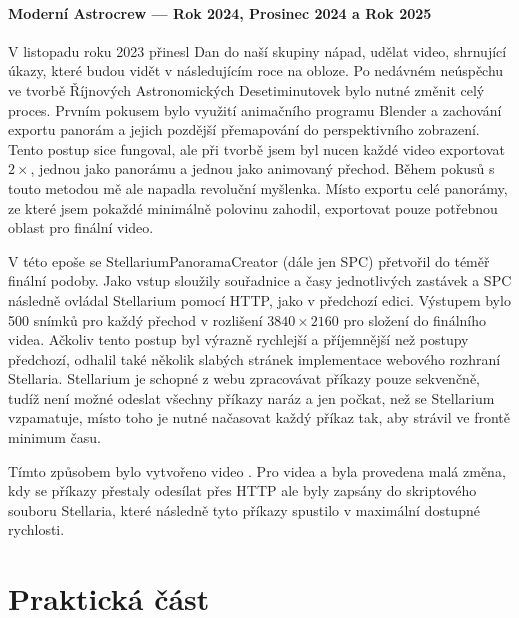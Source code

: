 \documentclass[12pt,a4paper,titlepage]{article}
\begin{document}
\subsection{Moderní Astrocrew --- Rok 2024, Prosinec 2024 a Rok 2025}
V listopadu roku 2023 přinesl Dan do naší skupiny nápad, udělat video, shrnující úkazy, které budou vidět v následujícím roce na obloze. Po nedávném neúspěchu ve tvorbě Říjnových Astronomických Desetiminutovek bylo nutné změnit celý proces. Prvním pokusem bylo využití animačního programu Blender a zachování exportu panorám a jejich pozdější přemapování do perspektivního zobrazení. Tento postup sice fungoval, ale při tvorbě jsem byl nucen každé video exportovat \(2\times \), jednou jako panorámu a jednou jako animovaný přechod. Během pokusů s touto metodou mě ale napadla revoluční myšlenka. Místo exportu celé panorámy, ze které jsem pokaždé minimálně polovinu zahodil, exportovat pouze potřebnou oblast pro finální video. 

V této epoše se StellariumPanoramaCreator (dále jen SPC) přetvořil do téměř finální podoby. Jako vstup sloužily souřadnice a časy jednotlivých zastávek a SPC následně ovládal Stellarium pomocí HTTP, jako v předchozí edici. Výstupem bylo 500 snímků pro každý přechod v rozlišení \(3840\times2160\) pro složení do finálního videa. Ačkoliv tento postup byl výrazně rychlejší a příjemnější než postupy předchozí, odhalil také několik slabých stránek implementace webového rozhraní Stellaria. Stellarium je schopné z webu zpracovávat příkazy pouze sekvenčně, tudíž není možné odeslat všechny příkazy naráz a jen počkat, než se Stellarium vzpamatuje, místo toho je nutné načasovat každý příkaz tak, aby strávil ve frontě minimum času.

Tímto způsobem bylo vytvořeno video . Pro videa  a  byla provedena malá změna, kdy se příkazy přestaly odesílat přes HTTP ale byly zapsány do skriptového souboru Stellaria, které následně tyto příkazy spustilo v maximální dostupné rychlosti.
\newpage
\part{Praktická část}
\newpage
\end{document}

